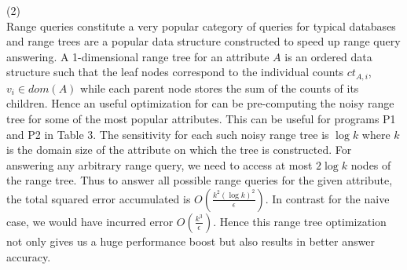 \begin{comment}
For answering queries of the form $\phi=A_1==v_1\wedge \ldots  \wedge A_n==v_n$, ideally we just need to compute for $A_2==v_2\wedge \ldots \wedge A_n==v_n$ on $ct_{A,v}$ number of records starting from position $\sum_{i=1}^{i=v-1}ct_{A,i}$ of $\boldsymbol{\mathcal{\tilde{D}}}_{sort}$. 

However the \textsf{AS} has access only to the noisy CDF over the $k$ bins $ct_{A,i}$. Note that when $\bar{i}_{start}=\bar{\hat{\mathcal{C}}}[v-1] < \sum_{i=1}^{i=v-1}ct_{A,i}$ and $\bar{i}_{end}= \bar{\hat{\mathcal{C}}}[v-1] > i_{start}+ct_{A,v}$, i.e., the indices computed from the noisy values  saddle over the true records satisfying $A==v$, then although we end up loosing in performance a bit, we are still guaranteed to compute the exact non-noisy count for records satisfying $\phi$. 

In all other cases, we end up disregarding some of the records that satisfy $A==v$, some of these rejected records in fact might additionally satisfy $A_1==v_1 \wedge \ldots \wedge A_n==v_n$. Thus we might get inaccurate answer for query predicate $\phi$ (note that here we are talking about the encrypted true count of the given query predicate that is computed by the AS via a series of transformations before applying the LaplaceMechanism primitive).  An effective heuristic to tackle this can be to compensate for the expected laplacian error as follows  $\bar{i}_{start}= \bar{\hat{\mathcal{C}}}[v-1]-\frac{2}{\epsilon}$ and $\bar{i}_{end}=\bar{\hat{\mathcal{C}}}[v]+\frac{2}{\epsilon}$. Also note that answering differentially private  range queries   on attribute $A$ can also be directly done from the noisy CDF $\bar{\hat{\mathcal{C}}}$ 
\end{comment}
 (2)\\
 Range queries constitute a very popular category of queries for typical databases and range trees are a popular data structure constructed to speed up range query answering. A 1-dimensional range tree for an attribute $A$ is an ordered data structure such that the leaf nodes correspond to the individual counts $ct_{A,i}$, $v_i \in dom(A)$ while each parent node stores the sum of the counts of its children. Hence an useful optimization for \system can be pre-computing the noisy range tree for some of the most popular attributes. This can be useful for programs P1 and P2 in Table 3. %
 The sensitivity for each such noisy range tree is $\log k$ where $k$ is the domain size of the attribute on which the tree is constructed. For answering any arbitrary range query, we need to access at most $2\log k$ nodes of the range tree. Thus to answer all possible range queries for the given attribute, the total squared error accumulated is $O(\frac{k^2(\log k)^2 }{\epsilon})$. In contrast for the naive case, we would have incurred error $O(\frac{k^3}{\epsilon})$. Hence this range tree optimization not only gives us a huge performance boost but also results in better answer accuracy. \\
